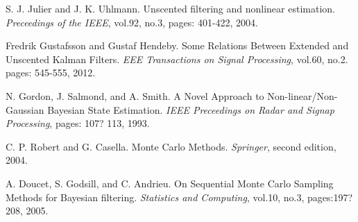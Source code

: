 \documentclass[10pt,twocolumn,letterpaper]{article}
\begin{document}
\begin{thebibliography}{1}
 S. J. Julier and J. K. Uhlmann. Unscented filtering and nonlinear estimation.
 \emph{Preceedings of the IEEE}, vol.92, no.3, pages: 401-422, 2004.

 Fredrik Gustafsson and Gustaf Hendeby. Some Relations Between Extended and Unscented Kalman Filters.
 \emph{EEE Transactions on Signal Processing}, vol.60, no.2. pages: 545-555, 2012.

 N. Gordon, J. Salmond, and A. Smith. A Novel Approach to Non-linear/Non-Gaussian Bayesian State Estimation.
 \emph{IEEE Preceedings on Radar and Signap Processing}, pages: 107? 113, 1993.

 C. P. Robert and G. Casella. Monte Carlo Methods.
 \emph{Springer}, second edition, 2004.

 A. Doucet, S. Godsill, and C. Andrieu. On Sequential Monte Carlo Sampling Methods for Bayesian filtering.
 \emph{Statistics and Computing}, vol.10, no.3, pages:197?208, 2005.
\end{thebibliography}
\end{document}
